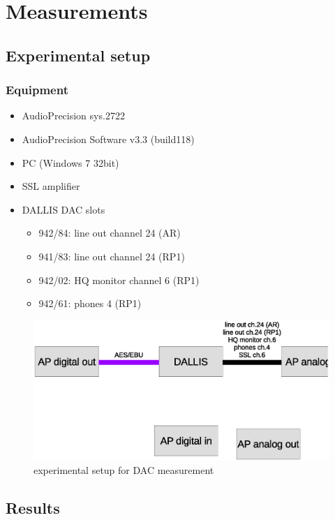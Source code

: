 \documentclass[11pt]{report}
\begin{document}
\section{Measurements}
	\subsection{Experimental setup}
		\subsubsection{Equipment}
\begin{itemize}
\item AudioPrecision sys.2722
\item AudioPrecision Software v3.3 (build118)
\item PC (Windows 7 32bit)
\item SSL amplifier
\item DALLIS DAC slots
\begin{itemize}
\item 942/84: line out channel 24 (AR)
\item 941/83: line out channel 24 (RP1)
\item 942/02: HQ monitor channel 6 (RP1)
\item 942/61: phones 4 (RP1)
\end{itemize}
\end{itemize}
\begin{figure}[htbp]
\begin{center}
\includegraphics[width=14cm,keepaspectratio=true]{DACstructure}
\caption{experimental setup for DAC measurement}
\label{Abb.:1}
\end{center}
\end{figure}
	\subsection{Results}
\end{document}
